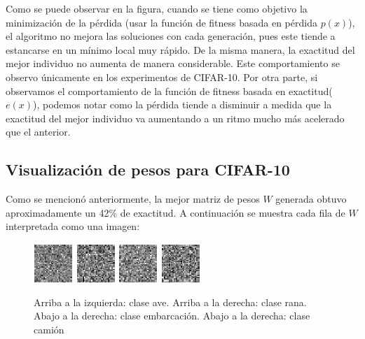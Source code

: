 \documentclass[conference]{IEEEtran}
\begin{document}
Como se puede observar en la figura, cuando se tiene como objetivo la minimización de la pérdida (usar la función de fitness basada en pérdida $p(x)$), el algoritmo no mejora las soluciones con cada generación, pues este tiende a estancarse en un mínimo local muy rápido. De la misma manera, la exactitud del mejor individuo no aumenta de manera considerable. Este comportamiento se observo únicamente en los experimentos de CIFAR-10. Por otra parte, si observamos el comportamiento de la función de fitness basada en exactitud($e(x)$), podemos notar como la pérdida tiende a disminuir a medida que la exactitud del mejor individuo va aumentando a un ritmo mucho más acelerado que el anterior.

\subsection{Visualización de pesos para CIFAR-10}
Como se mencionó anteriormente, la mejor matriz de pesos $W$ generada obtuvo aproximadamente un 42\% de exactitud.
A continuación se muestra cada fila de $W$ interpretada como una imagen:


\begin{figure}[h]


\begin{center}
\includegraphics[width=.2\textwidth]{w/bird}
\includegraphics[width=.2\textwidth]{w/frog}
\includegraphics[width=.2\textwidth]{w/ship}
\includegraphics[width=.2\textwidth]{w/truck}
\end{center}
\caption{Arriba a la izquierda: clase ave. Arriba a la derecha: clase rana. Abajo a la derecha: clase embarcación. Abajo a la derecha: clase camión}

\end{figure}
\end{document}
